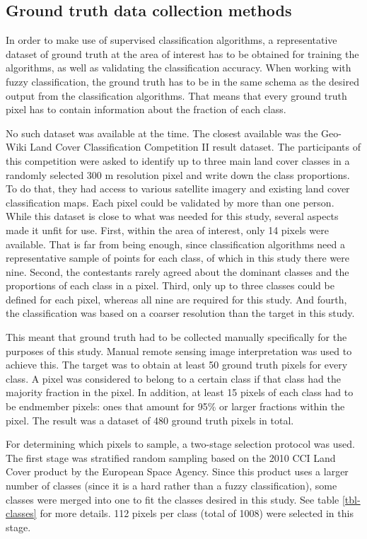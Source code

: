 \documentclass[a4paper,10pt]{book}
\begin{document}
\subsection{Ground truth data collection methods}

In order to make use of supervised classification algorithms, a representative dataset of ground truth at the area of interest has to be obtained for training the algorithms, as well as validating the classification accuracy. When working with fuzzy classification, the ground truth has to be in the same schema as the desired output from the classification algorithms. That means that every ground truth pixel has to contain information about the fraction of each class.

No such dataset was available at the time. The closest available was the Geo-Wiki Land Cover Classification Competition II result dataset. The participants of this competition were asked to identify up to three main land cover classes in a randomly selected 300 m resolution pixel and write down the class proportions. To do that, they had access to various satellite imagery and existing land cover classification maps. Each pixel could be validated by more than one person. While this dataset is close to what was needed for this study, several aspects made it unfit for use. First, within the area of interest, only 14 pixels were available. That is far from being enough, since classification algorithms need a representative sample of points for each class, of which in this study there were nine. Second, the contestants rarely agreed about the dominant classes and the proportions of each class in a pixel. Third, only up to three classes could be defined for each pixel, whereas all nine are required for this study. And fourth, the classification was based on a coarser resolution than the target in this study.

This meant that ground truth had to be collected manually specifically for the purposes of this study. Manual remote sensing image interpretation \citep{defries1998training} was used to achieve this. The target was to obtain at least 50 ground truth pixels for every class. A pixel was considered to belong to a certain class if that class had the majority fraction in the pixel. In addition, at least 15 pixels of each class had to be endmember pixels: ones that amount for 95\% or larger fractions within the pixel. The result was a dataset of 480 ground truth pixels in total.

For determining which pixels to sample, a two-stage selection protocol was used. The first stage was stratified random sampling based on the 2010 CCI Land Cover product by the European Space Agency. Since this product uses a larger number of classes (since it is a hard rather than a fuzzy classification), some classes were merged into one to fit the classes desired in this study. See table \ref{tbl-classes} for more details. 112 pixels per class (total of 1008) were selected in this stage.
\end{document}
